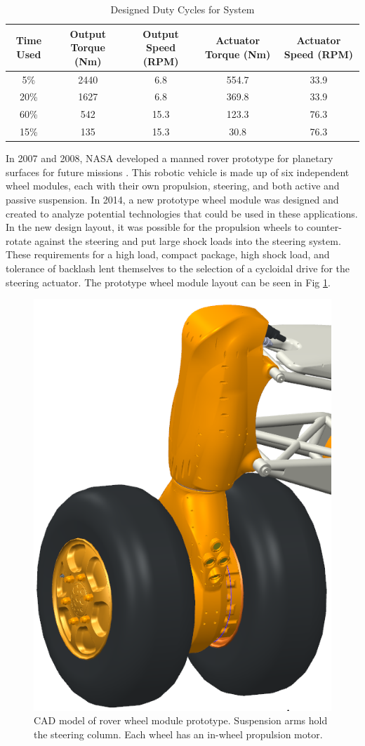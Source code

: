 \begin{table}[t]
\caption{Designed Duty Cycles for System}
\label{duty_cycle}
\begin{center}
\begin{tabular}{|c||c||c| |c| |c|}
\hline
Time Used & Output Torque (Nm) & Output Speed (RPM) & Actuator Torque (Nm) & Actuator Speed (RPM)\\
\hline
5\% & 2440 & 6.8 & 554.7 & 33.9\\
\hline
20\% & 1627 & 6.8 & 369.8 & 33.9\\
\hline
60\% & 542 & 15.3 & 123.3 & 76.3\\
\hline
15\% & 135 & 15.3 & 30.8 & 76.3\\
\hline
\end{tabular}
\end{center}
\end{table}


   
In 2007 and 2008, NASA developed a manned rover prototype for planetary surfaces for future missions \cite{rover}. This robotic vehicle is made up of six independent wheel modules, each with their own propulsion, steering, and both active and passive suspension. In 2014, a new prototype wheel module was designed and created to analyze potential technologies that could be used in these applications. In the new design layout, it was possible for the propulsion wheels to counter-rotate against the steering and put large shock loads into the steering system. These requirements for a high load, compact package, high shock load, and tolerance of backlash lent themselves to the selection of a cycloidal drive for the steering actuator. The prototype wheel module layout can be seen in Fig \ref{wheel_module}.

   \begin{figure}[t]
      \centering
      \includegraphics[width=0.50\linewidth]{wheel_module_CAD}
      \caption{CAD model of rover wheel module prototype. Suspension arms hold the steering column. Each wheel has an in-wheel propulsion motor.}
      \label{wheel_module}
   \end{figure}
   
